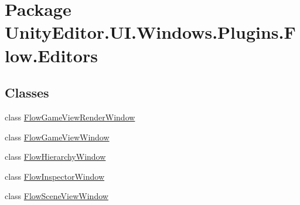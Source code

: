 \hypertarget{namespace_unity_editor_1_1_u_i_1_1_windows_1_1_plugins_1_1_flow_1_1_editors}{}\section{Package Unity\+Editor.\+U\+I.\+Windows.\+Plugins.\+Flow.\+Editors}
\label{namespace_unity_editor_1_1_u_i_1_1_windows_1_1_plugins_1_1_flow_1_1_editors}
\subsection*{Classes}
\begin{DoxyCompactItemize}
\item 
class \hyperlink{class_unity_editor_1_1_u_i_1_1_windows_1_1_plugins_1_1_flow_1_1_editors_1_1_flow_game_view_render_window}{Flow\+Game\+View\+Render\+Window}
\item 
class \hyperlink{class_unity_editor_1_1_u_i_1_1_windows_1_1_plugins_1_1_flow_1_1_editors_1_1_flow_game_view_window}{Flow\+Game\+View\+Window}
\item 
class \hyperlink{class_unity_editor_1_1_u_i_1_1_windows_1_1_plugins_1_1_flow_1_1_editors_1_1_flow_hierarchy_window}{Flow\+Hierarchy\+Window}
\item 
class \hyperlink{class_unity_editor_1_1_u_i_1_1_windows_1_1_plugins_1_1_flow_1_1_editors_1_1_flow_inspector_window}{Flow\+Inspector\+Window}
\item 
class \hyperlink{class_unity_editor_1_1_u_i_1_1_windows_1_1_plugins_1_1_flow_1_1_editors_1_1_flow_scene_view_window}{Flow\+Scene\+View\+Window}
\end{DoxyCompactItemize}
